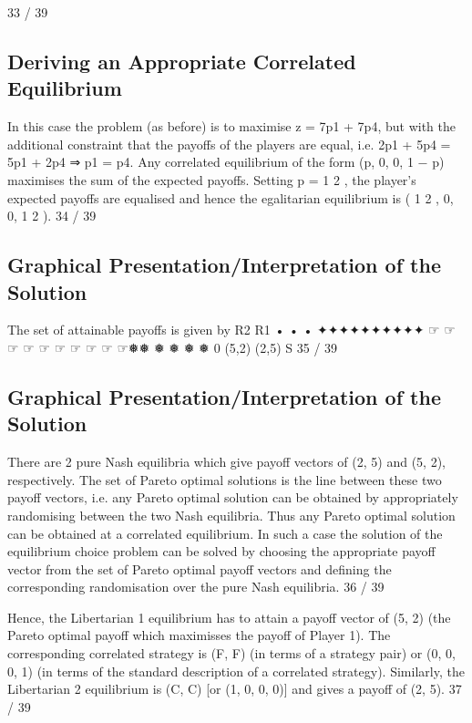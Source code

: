 \documentclass[]{report}
\begin{document}
33 / 39

\subsection{Deriving an Appropriate Correlated Equilibrium}
In this case the problem (as before) is to maximise z = 7p1 + 7p4,
but with the additional constraint that the payoffs of the players
are equal, i.e.
2p1 + 5p4 = 5p1 + 2p4 ⇒ p1 = p4.
Any correlated equilibrium of the form (p, 0, 0, 1 − p) maximises
the sum of the expected payoffs.
Setting p =
1
2
, the player’s expected payoffs are equalised and
hence the egalitarian equilibrium is ( 1
2
, 0, 0,
1
2
).
34 / 39
\subsection{Graphical Presentation/Interpretation of the Solution}
The set of attainable payoffs is given by
R2
R1
•
•
•
✦✦✦✦✦✦✦✦✦✦
☞
☞
☞
☞
☞
☞
☞
☞
☞
☞❅❅
❅
❅
❅
❅
0
(5,2)
(2,5)
S
35 / 39

\subsection{Graphical Presentation/Interpretation of the Solution}
There are 2 pure Nash equilibria which give payoff vectors of (2, 5)
and (5, 2), respectively.
The set of Pareto optimal solutions is the line between these two
payoff vectors, i.e. any Pareto optimal solution can be obtained by
appropriately randomising between the two Nash equilibria.
Thus any Pareto optimal solution can be obtained at a correlated
equilibrium.
In such a case the solution of the equilibrium choice problem can
be solved by choosing the appropriate payoff vector from the set of
Pareto optimal payoff vectors and defining the corresponding
randomisation over the pure Nash equilibria.
36 / 39

Hence, the Libertarian 1 equilibrium has to attain a payoff vector
of (5, 2) (the Pareto optimal payoff which maximisses the payoff of
Player 1). The corresponding correlated strategy is (F, F) (in
terms of a strategy pair) or (0, 0, 0, 1) (in terms of the standard
description of a correlated strategy).
Similarly, the Libertarian 2 equilibrium is (C, C) [or (1, 0, 0, 0)] and
gives a payoff of (2, 5).
37 / 39
\end{document}
